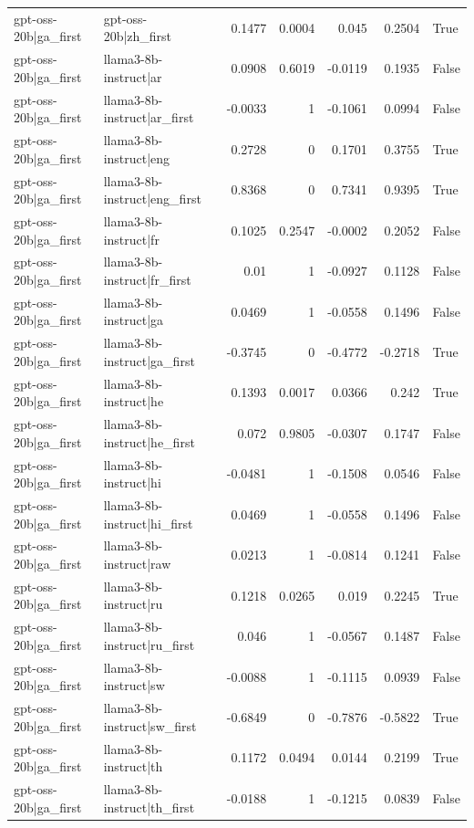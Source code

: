 \begin{table}
\begin{tabular}{l l r r r r l}
gpt-oss-20b|ga_first & gpt-oss-20b|zh_first & 0.1477 & 0.0004 & 0.045 & 0.2504 & True \\
gpt-oss-20b|ga_first & llama3-8b-instruct|ar & 0.0908 & 0.6019 & -0.0119 & 0.1935 & False \\
gpt-oss-20b|ga_first & llama3-8b-instruct|ar_first & -0.0033 & 1 & -0.1061 & 0.0994 & False \\
gpt-oss-20b|ga_first & llama3-8b-instruct|eng & 0.2728 & 0 & 0.1701 & 0.3755 & True \\
gpt-oss-20b|ga_first & llama3-8b-instruct|eng_first & 0.8368 & 0 & 0.7341 & 0.9395 & True \\
gpt-oss-20b|ga_first & llama3-8b-instruct|fr & 0.1025 & 0.2547 & -0.0002 & 0.2052 & False \\
gpt-oss-20b|ga_first & llama3-8b-instruct|fr_first & 0.01 & 1 & -0.0927 & 0.1128 & False \\
gpt-oss-20b|ga_first & llama3-8b-instruct|ga & 0.0469 & 1 & -0.0558 & 0.1496 & False \\
gpt-oss-20b|ga_first & llama3-8b-instruct|ga_first & -0.3745 & 0 & -0.4772 & -0.2718 & True \\
gpt-oss-20b|ga_first & llama3-8b-instruct|he & 0.1393 & 0.0017 & 0.0366 & 0.242 & True \\
gpt-oss-20b|ga_first & llama3-8b-instruct|he_first & 0.072 & 0.9805 & -0.0307 & 0.1747 & False \\
gpt-oss-20b|ga_first & llama3-8b-instruct|hi & -0.0481 & 1 & -0.1508 & 0.0546 & False \\
gpt-oss-20b|ga_first & llama3-8b-instruct|hi_first & 0.0469 & 1 & -0.0558 & 0.1496 & False \\
gpt-oss-20b|ga_first & llama3-8b-instruct|raw & 0.0213 & 1 & -0.0814 & 0.1241 & False \\
gpt-oss-20b|ga_first & llama3-8b-instruct|ru & 0.1218 & 0.0265 & 0.019 & 0.2245 & True \\
gpt-oss-20b|ga_first & llama3-8b-instruct|ru_first & 0.046 & 1 & -0.0567 & 0.1487 & False \\
gpt-oss-20b|ga_first & llama3-8b-instruct|sw & -0.0088 & 1 & -0.1115 & 0.0939 & False \\
gpt-oss-20b|ga_first & llama3-8b-instruct|sw_first & -0.6849 & 0 & -0.7876 & -0.5822 & True \\
gpt-oss-20b|ga_first & llama3-8b-instruct|th & 0.1172 & 0.0494 & 0.0144 & 0.2199 & True \\
gpt-oss-20b|ga_first & llama3-8b-instruct|th_first & -0.0188 & 1 & -0.1215 & 0.0839 & False \\

\end{tabular}
\end{table}
